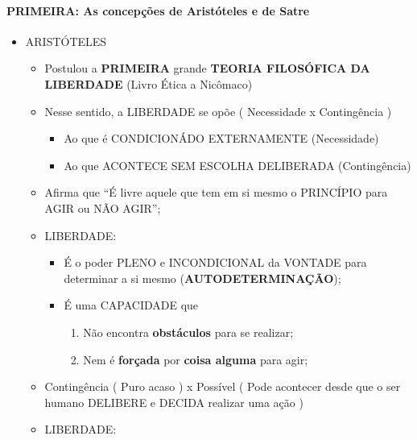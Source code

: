 \documentclass[
]{book}
\providecommand{\tightlist}{%
  \setlength{\itemsep}{0pt}\setlength{\parskip}{0pt}}
\begin{document}
\hypertarget{primeira-as-concepuxe7uxf5es-de-aristuxf3teles-e-de-satre}{%
\paragraph{PRIMEIRA: As concepções de Aristóteles e de
Satre}\label{primeira-as-concepuxe7uxf5es-de-aristuxf3teles-e-de-satre}}

\begin{itemize}
\tightlist
\item
  ARISTÓTELES

  \begin{itemize}
  \tightlist
  \item
    Postulou a \textbf{PRIMEIRA} grande \textbf{TEORIA FILOSÓFICA DA
    LIBERDADE} (Livro Ética a Nicômaco)
  \item
    Nesse sentido, a LIBERDADE se opõe ( Necessidade x Contingência )

    \begin{itemize}
    \tightlist
    \item
      Ao que é CONDICIONÁDO EXTERNAMENTE (Necessidade)
    \item
      Ao que ACONTECE SEM ESCOLHA DELIBERADA (Contingência)
    \end{itemize}
  \item
    Afirma que ``É livre aquele que tem em si mesmo o PRINCÍPIO para
    AGIR ou NÃO AGIR'';
  \item
    LIBERDADE:

    \begin{itemize}
    \tightlist
    \item
      É o poder PLENO e INCONDICIONAL da VONTADE para determinar a si
      mesmo (\textbf{AUTODETERMINAÇÃO});
    \item
      É uma CAPACIDADE que

      \begin{enumerate}
      \def\labelenumi{\alph{enumi}.}
      \tightlist
      \item
        Não encontra \textbf{obstáculos} para se realizar;
      \item
        Nem é \textbf{forçada} por \textbf{coisa alguma} para agir;
      \end{enumerate}
    \end{itemize}
  \item
    Contingência ( Puro acaso ) x Possível ( Pode acontecer desde que o
    ser humano DELIBERE e DECIDA realizar uma ação )
  \item
    LIBERDADE:


\end{itemize}
\end{itemize}
\end{document}
